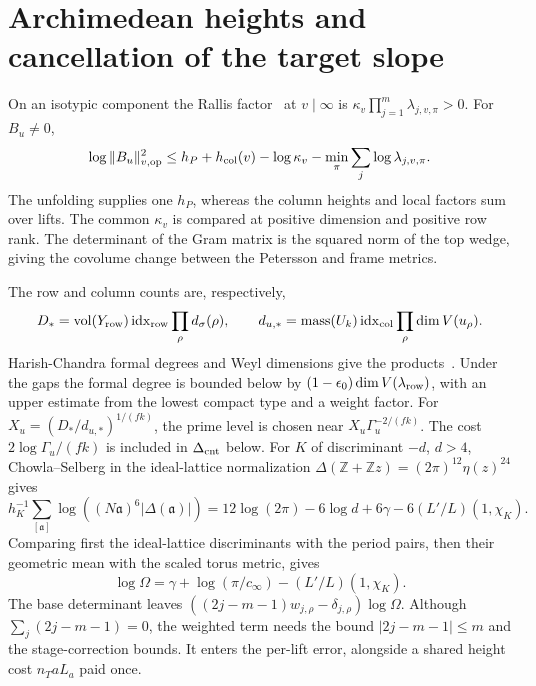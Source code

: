 \documentclass[letterpaper,11pt]{article}
\newcommand{\ZZ}{\mathbb Z}
\begin{document}
\section{Archimedean heights and cancellation of the target slope}\label{sec:height}
On an isotypic component the Rallis factor~\cite{rallis} at \(v\mid\infty\) is \(\kappa_v\prod_{j=1}^m\lambda_{j,v,\pi}>0\). For \(B_u\ne0\),
\[
 \log\|B_u\|_{v,\mathrm{op}}^2
 \le h_P+h_{\rm col}(v)-\log\kappa_v-\min_\pi\sum_j\log\lambda_{j,v,\pi}.
\]
The unfolding supplies one \(h_P\), whereas the column heights and local factors sum over lifts. The common \(\kappa_v\) is compared at positive dimension and positive row rank. The determinant of the Gram matrix is the squared norm of the top wedge, giving the covolume change between the Petersson and frame metrics.

The row and column counts are, respectively,
\[
 D_*=\operatorname{vol}(Y_{\rm row})\,{\rm idx}_{\rm row}\prod_\rho d_\sigma(\rho),
 \qquad d_{u,*}=\operatorname{mass}(U_k)\,{\rm idx}_{\rm col}\prod_\rho\dim V(u_\rho).
\]
Harish-Chandra formal degrees and Weyl dimensions give the products~\cite{mass}. Under the gaps the formal degree is bounded below by \((1-\epsilon_0)\dim V(\lambda_{\rm row})\), with an upper estimate from the lowest compact type and a weight factor. For \(X_u=(D_*/d_{u,*})^{1/(fk)}\), the prime level is chosen near \(X_u\Gamma_u^{-2/(fk)}\). The cost \(2\log\Gamma_u/(fk)\) is included in \(\Delta_{\rm cnt}\) below. For \(K\) of discriminant \(-d\), \(d>4\), Chowla--Selberg in the ideal-lattice normalization \(\Delta(\ZZ+\ZZ z)=(2\pi)^{12}\eta(z)^{24}\) gives~\cite{cs}
\[
 h_K^{-1}\!\sum_{[\mathfrak a]}\log\!\left((N\mathfrak a)^6|\Delta(\mathfrak a)|\right)
 =12\log(2\pi)-6\log d+6\gamma-6(L'/L)(1,\chi_K).
\]
Comparing first the ideal-lattice discriminants with the period pairs, then their geometric mean with the scaled torus metric, gives
\[
 \log\Omega=\gamma+\log(\pi/c_\infty)-(L'/L)(1,\chi_K).
\]
The base determinant leaves \(((2j-m-1)w_{j,\rho}-\delta_{j,\rho})\log\Omega\). Although \(\sum_j(2j-m-1)=0\), the weighted term needs the bound \(|2j-m-1|\le m\) and the stage-correction bounds. It enters the per-lift error, alongside a shared height cost \(n_TaL_a\) paid once.
\end{document}
